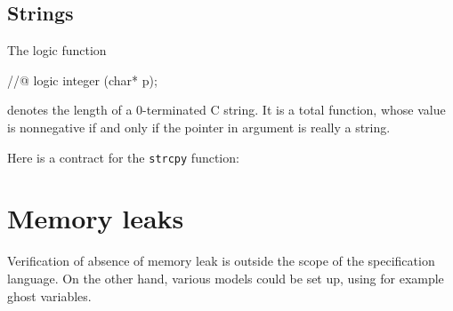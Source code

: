 \subsection{Strings}

\experimental
\begin{notimplementedenv}
The logic function
\begin{listing-nonumber}
//@ logic integer \strlen(char* p);
\end{listing-nonumber}
\end{notimplementedenv}
denotes the length of a 0-terminated C string. It is a total function,
whose value is nonnegative if and only if the pointer in argument is
really a string.

\begin{example}
  Here is a contract for the \lstinline|strcpy| function:

\end{example}

\section{Memory leaks}

\experimental

Verification of absence of memory leak is outside the scope of the
specification language. On the other hand, various models could be set
up, using for example ghost variables.

